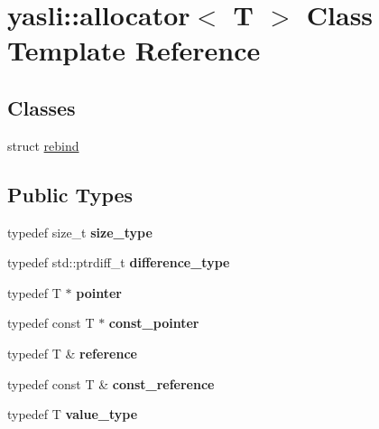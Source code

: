 \hypertarget{classyasli_1_1allocator}{}\section{yasli\+:\+:allocator$<$ T $>$ Class Template Reference}
\label{classyasli_1_1allocator}
\subsection*{Classes}
\begin{DoxyCompactItemize}
\item 
struct \hyperlink{structyasli_1_1allocator_1_1rebind}{rebind}
\end{DoxyCompactItemize}
\subsection*{Public Types}
\begin{DoxyCompactItemize}
\item 
\hypertarget{classyasli_1_1allocator_a3d6fd04b780eef986bce50e9e722528b}{}typedef size\+\_\+t {\bfseries size\+\_\+type}\label{classyasli_1_1allocator_a3d6fd04b780eef986bce50e9e722528b}

\item 
\hypertarget{classyasli_1_1allocator_ab6957bfc22d07ed6a6d81927915036b2}{}typedef std\+::ptrdiff\+\_\+t {\bfseries difference\+\_\+type}\label{classyasli_1_1allocator_ab6957bfc22d07ed6a6d81927915036b2}

\item 
\hypertarget{classyasli_1_1allocator_a4357c32013633d44e343fbb97dee2b32}{}typedef T $\ast$ {\bfseries pointer}\label{classyasli_1_1allocator_a4357c32013633d44e343fbb97dee2b32}

\item 
\hypertarget{classyasli_1_1allocator_ae0fb29c24332c94d24f49129a486c12f}{}typedef const T $\ast$ {\bfseries const\+\_\+pointer}\label{classyasli_1_1allocator_ae0fb29c24332c94d24f49129a486c12f}

\item 
\hypertarget{classyasli_1_1allocator_afc7ed4c117c5b67e947d9f7f3492cb08}{}typedef T \& {\bfseries reference}\label{classyasli_1_1allocator_afc7ed4c117c5b67e947d9f7f3492cb08}

\item 
\hypertarget{classyasli_1_1allocator_a89a7fb909684c3b5e3c7e89f52e102aa}{}typedef const T \& {\bfseries const\+\_\+reference}\label{classyasli_1_1allocator_a89a7fb909684c3b5e3c7e89f52e102aa}

\item 
\hypertarget{classyasli_1_1allocator_aef6c7a83ab026399ad18a0c5efb13535}{}typedef T {\bfseries value\+\_\+type}\label{classyasli_1_1allocator_aef6c7a83ab026399ad18a0c5efb13535}

\end{DoxyCompactItemize}
